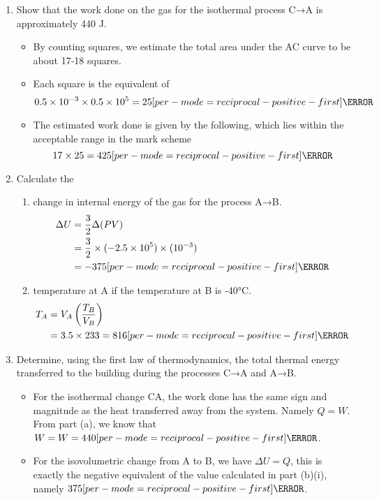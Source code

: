 \documentclass[a4paper,12pt]{article}
\let\oldsi\si
\renewcommand{\si}[1]{\oldsi[per-mode=reciprocal-positive-first]{#1}}
\begin{document}
\begin{enumerate}[label=(\alph*)]
  \item Show that the work done on the gas for the isothermal process C→A is approximately 440 J.
        \begin{itemize}
          \item By counting squares, we estimate the total area under the AC curve to be about 17-18 squares.
          \item Each square is the equivalent of $$0.5 \times 10^{-3} \times 0.5 \times 10^5 = 25\si{\joule}$$
          \item The estimated work done is given by the following, which lies within the acceptable range in the mark scheme $$17 \times 25 = 425\si{\joule}$$
        \end{itemize}
  \item Calculate the
        \begin{enumerate}[label=(\roman*)]
          \item change in internal energy of the gas for the process A→B.
                \begin{align*}
                  \Delta U & = \frac{3}{2}\Delta(PV)                                  \\
                           & = \frac{3}{2} \times (-2.5 \times 10^5) \times (10^{-3}) \\
                           & = -375\si{\joule}
                \end{align*}
          \item temperature at A if the temperature at B is -40°C.
                \begin{align*}
                  T_A & = V_A\left(\frac{T_B}{V_B}\right) \\
                      & = 3.5\times233 = 816\si{\kelvin}
                \end{align*}
        \end{enumerate}
  \item Determine, using the first law of thermodynamics, the total thermal energy transferred to the building during the processes C→A and A→B.
        \begin{itemize}
          \item For the isothermal change CA, the work done has the same sign and magnitude as the heat transferred away from the system. Namely $Q = W$. From part (a), we know that $W = W = 440\si{\joule}$.
          \item For the isovolumetric change from A to B, we have $\Delta U = Q$, this is exactly the negative equivalent of the value calculated in part (b)(i), namely $375\si{\joule}$.

\end{itemize}
\end{enumerate}
\end{document}
